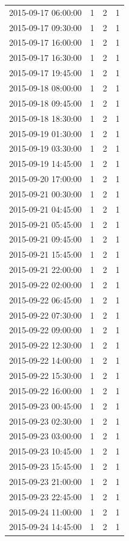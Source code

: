 \begin{tabular}{lrrr}
2015-09-17 06:00:00 & 1 & 2 & 1 \\
2015-09-17 09:30:00 & 1 & 2 & 1 \\
2015-09-17 16:00:00 & 1 & 2 & 1 \\
2015-09-17 16:30:00 & 1 & 2 & 1 \\
2015-09-17 19:45:00 & 1 & 2 & 1 \\
2015-09-18 08:00:00 & 1 & 2 & 1 \\
2015-09-18 09:45:00 & 1 & 2 & 1 \\
2015-09-18 18:30:00 & 1 & 2 & 1 \\
2015-09-19 01:30:00 & 1 & 2 & 1 \\
2015-09-19 03:30:00 & 1 & 2 & 1 \\
2015-09-19 14:45:00 & 1 & 2 & 1 \\
2015-09-20 17:00:00 & 1 & 2 & 1 \\
2015-09-21 00:30:00 & 1 & 2 & 1 \\
2015-09-21 04:45:00 & 1 & 2 & 1 \\
2015-09-21 05:45:00 & 1 & 2 & 1 \\
2015-09-21 09:45:00 & 1 & 2 & 1 \\
2015-09-21 15:45:00 & 1 & 2 & 1 \\
2015-09-21 22:00:00 & 1 & 2 & 1 \\
2015-09-22 02:00:00 & 1 & 2 & 1 \\
2015-09-22 06:45:00 & 1 & 2 & 1 \\
2015-09-22 07:30:00 & 1 & 2 & 1 \\
2015-09-22 09:00:00 & 1 & 2 & 1 \\
2015-09-22 12:30:00 & 1 & 2 & 1 \\
2015-09-22 14:00:00 & 1 & 2 & 1 \\
2015-09-22 15:30:00 & 1 & 2 & 1 \\
2015-09-22 16:00:00 & 1 & 2 & 1 \\
2015-09-23 00:45:00 & 1 & 2 & 1 \\
2015-09-23 02:30:00 & 1 & 2 & 1 \\
2015-09-23 03:00:00 & 1 & 2 & 1 \\
2015-09-23 10:45:00 & 1 & 2 & 1 \\
2015-09-23 15:45:00 & 1 & 2 & 1 \\
2015-09-23 21:00:00 & 1 & 2 & 1 \\
2015-09-23 22:45:00 & 1 & 2 & 1 \\
2015-09-24 11:00:00 & 1 & 2 & 1 \\
2015-09-24 14:45:00 & 1 & 2 & 1 \\

\end{tabular}
